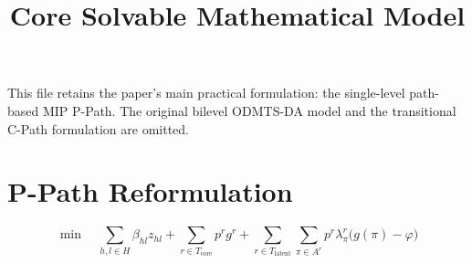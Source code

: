 \documentclass{article}
\title{Core Solvable Mathematical Model}
\author{}
\date{}
\begin{document}
\maketitle

This file retains the paper's main practical formulation: the single-level path-based MIP P-Path. The original bilevel ODMTS-DA model and the transitional C-Path formulation are omitted.

\section{P-Path Reformulation}

\begin{equation}
\min \quad
\sum_{h,l\in H} \beta_{hl} z_{hl}
+ \sum_{r\in T_{\mathrm{core}}} p^r g^r
+ \sum_{r\in T_{\mathrm{latent}}} \sum_{\pi\in A^r} p^r \lambda_\pi^r \bigl(g(\pi)-\varphi\bigr)
\tag{15a}
\end{equation}
\end{document}
